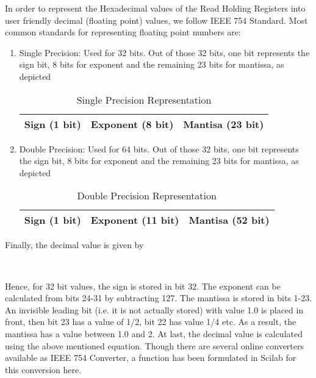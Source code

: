 In order to represent the Hexadecimal values of the Read Holding Registers into user friendly decimal (floating point) values, we follow IEEE 754 Standard. Most common standards for representing floating point numbers are: 
\begin{enumerate}
\item Single Precision: Used for 32 bits. Out of those 32 bits, one bit represents the sign bit, 8 bits for exponent and the remaining 23 bits for mantissa, as depicted  

\begin{table}
\centering
\caption{Single Precision Representation}
\label{tab:single-precision}
\begin{tabular}{|p{3cm}|p{3cm}|p{3cm}|}
\hline
 


            Sign (1 bit) & Exponent (8 bit) & Mantisa (23 bit) \\ \hline 
          \end{tabular}
\end{table}
\item Double Precision: Used for 64 bits. Out of those 32 bits, one bit represents the sign bit, 8 bits for     
            exponent and the remaining 23 bits for mantissa, as depicted 

\begin{table}
\centering
\caption{Double Precision Representation}
\label{tab:double-precision}
\begin{tabular}{ |p{3cm}|p{3cm}|p{3cm}|}
\hline


            Sign (1 bit) & Exponent (11 bit) & Mantisa (52 bit) \\ \hline
          \end{tabular}
\end{table}
\end{enumerate}
Finally, the decimal value is given by 

\begin {centering}  \\
\end{centering}

Hence, for 32 bit values, the sign is stored in bit 32. The exponent can be calculated from bits 24-31 by subtracting 127. The mantissa is stored in bits 1-23. An invisible leading bit (i.e. it is not actually stored) with value 1.0 is placed in front, then bit 23 has a value of 1/2, bit 22 has value 1/4 etc. As a result, the mantissa has a value between 1.0 and 2. At last, the decimal value is calculated using the above mentioned equation. Though there are several online converters available as IEEE 754 Converter, a function has been formulated in Scilab for this conversion here. 


